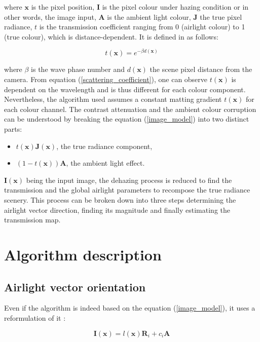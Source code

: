 \documentclass[conference]{IEEEtran}
\begin{document}
where $\mathbf{x}$ is the pixel position, $\mathbf{I}$ is the pixel colour under hazing condition or in other words, the image input, $\mathbf{A}$ is the ambient light colour,
$\mathbf{J}$ the true pixel radiance, $t$ is the transmission coefficient ranging from 0 (airlight colour)
to 1 (true colour), which is distance-dependent. It is defined in \cite{dehaze} as follows:

\begin{equation}
\label{scattering_coefficient}
t(\mathbf{x}) = e^{-\beta d(\mathbf{x})}
\end{equation}

where $\beta$ is the wave phase number and $d(\textbf{x})$ the scene pixel distance from the camera.  From equation (\ref{scattering_coefficient}),
one can observe $t(\mathbf{x})$ is dependent on the wavelength and is thus different for each colour component.  Nevertheless, the algorithm used assumes a constant matting gradient $t(\mathbf{x})$ for each colour channel.
The contrast attenuation and the ambient colour corruption can be understood by breaking the equation (\ref{image_model}) into two distinct parts: 
\begin{itemize}
    \item $t(\mathbf{x}) \mathbf{J}(\mathbf{x})$, the true radiance component,
    \item $(1-t(\mathbf{x})) \mathbf{A}$, the ambient light effect.
\end{itemize}
$\mathbf{I}(\mathbf{x})$ being the input image, the dehazing process is reduced to find the transmission and the global airlight parameters to recompose
the true radiance scenery.  This process can be broken down into three steps determining the airlight vector direction, finding its magnitude and finally estimating the transmission map.

\section{Algorithm description}
\subsection{Airlight vector orientation}  
\label{AmauryPart}

Even if the algorithm is indeed based on the equation (\ref{image_model}), it uses a reformulation of it \cite{airlight}:

\begin{equation}
\label{shading_coefficient}
\mathbf{I}(\mathbf{x}) = l(\mathbf{x}) \mathbf{R}_i + c_i \mathbf{A}
\end{equation}
\end{document}
